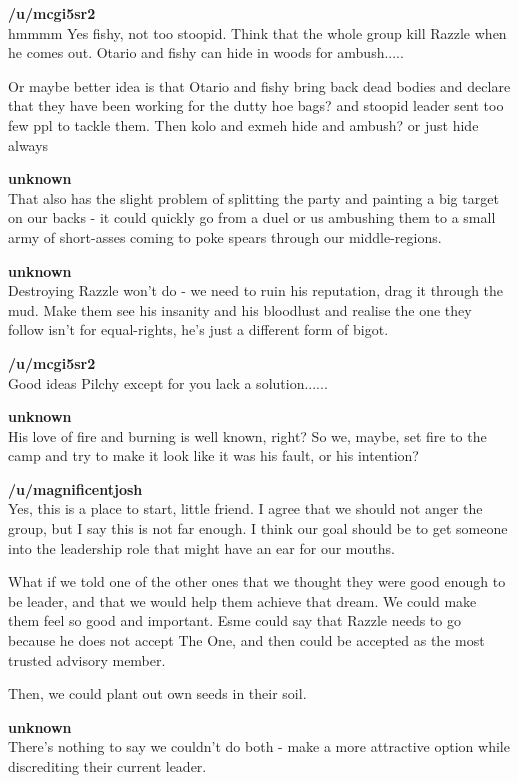 \textbf{/u/mcgi5sr2}\\
hmmmm Yes fishy, not too stoopid. Think that the whole group kill Razzle when he comes out. Otario and fishy can hide in woods for ambush.....\medskip

Or maybe better idea is that Otario and fishy bring back dead bodies and declare that they have been working for the dutty hoe bags? and stoopid leader sent too few ppl to tackle them. Then kolo and exmeh hide and ambush? or just hide always\medskip

\textbf{unknown}\\
That also has the slight problem of splitting the party and painting a big target on our backs - it could quickly go from a duel or us ambushing them to a small army of short-asses coming to poke spears through our middle-regions.\medskip

\textbf{unknown}\\
Destroying Razzle won't do - we need to ruin his reputation, drag it through the mud. Make them see his insanity and his bloodlust and realise the one they follow isn't for equal-rights, he's just a different form of bigot.\medskip

\textbf{/u/mcgi5sr2}\\
Good ideas Pilchy except for you lack a solution......\medskip

\textbf{unknown}\\
His love of fire and burning is well known, right? So we, maybe, set fire to the camp and try to make it look like it was his fault, or his intention?\medskip

\textbf{/u/magnificentjosh}\\
Yes, this is a place to start, little friend. I agree that we should not anger the group, but I say this is not far enough. I think our goal should be to get someone into the leadership role that might have an ear for our mouths.\medskip

What if we told one of the other ones that we thought they were good enough to be leader, and that we would help them achieve that dream. We could make them feel so good and important. Esme could say that Razzle needs to go because he does not accept The One, and then could be accepted as the most trusted advisory member.\medskip

Then, we could plant out own seeds in their soil.\medskip

\textbf{unknown}\\
There's nothing to say we couldn't do both - make a more attractive option while discrediting their current leader.\medskip

